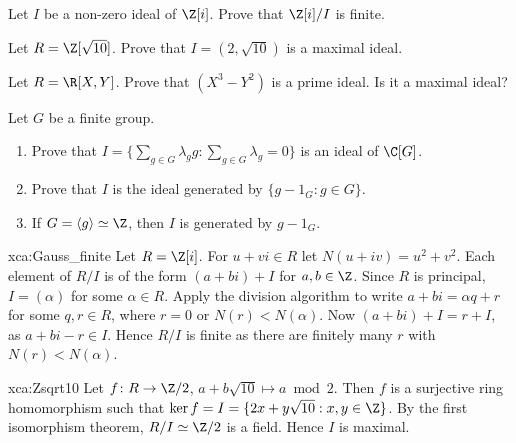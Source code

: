 \chapter*{}


\begin{prob}
	\label{xca:Gauss_finite}
	Let $I$ be a non-zero ideal of $\Z[i]$. Prove that 
	$\Z[i]/I$ is finite.
\end{prob}

\begin{exercise}
	\label{xca:Zsqrt10}
	Let $R=\Z[\sqrt{10}]$. Prove that $I=(2,\sqrt{10})$ is a maximal ideal. 
\end{exercise}

\begin{exercise}
	\label{xca:RXY_prime}
	Let $R=\R[X,Y]$.  Prove that $(X^3-Y^2)$ is a prime ideal. Is it a maximal
	ideal?
\end{exercise}

\begin{exercise}
	\label{xca:augmentation}
	Let $G$ be a finite group. 
	\begin{enumerate}
		\item Prove that $I=\{\sum_{g\in G}\lambda_gg:\sum_{g\in G}\lambda_g=0\}$ is an ideal of $\C[G]$.
		\item Prove that $I$ is the ideal generated by $\{g-1_G:g\in G\}$.
		\item If $G=\langle g\rangle\simeq\Z$, then $I$ is generated by $g-1_G$. 
	\end{enumerate}
\end{exercise}

\begin{sol}{xca:Gauss_finite}
	Let $R=\Z[i]$. For $u+vi\in R$ let $N(u+iv)=u^2+v^2$. 
	Each element of $R/I$ is of the form $(a+bi)+I$ for $a,b\in \Z$. Since $R$
	is principal, $I=(\alpha)$ for some $\alpha\in R$. Apply the division
	algorithm to write $a+bi=\alpha q+r$ for some $q,r\in R$, where $r=0$ or
	$N(r)<N(\alpha)$. Now $(a+bi)+I=r+I$, as $a+bi-r\in I$. Hence $R/I$ is
	finite as there are finitely many $r$ with $N(r)<N(\alpha)$. 
\end{sol}

\begin{sol}{xca:Zsqrt10}
	Let $f\colon R\to\Z/2$, $a+b\sqrt{10}\mapsto a\bmod 2$. Then $f$ is a
	surjective ring homomorphism such that $\ker
	f=I=\{2x+y\sqrt{10}:x,y\in\Z\}$. By the first isomorphism theorem,
	$R/I\simeq\Z/2$ is a field. Hence $I$ is maximal. 
\end{sol}

